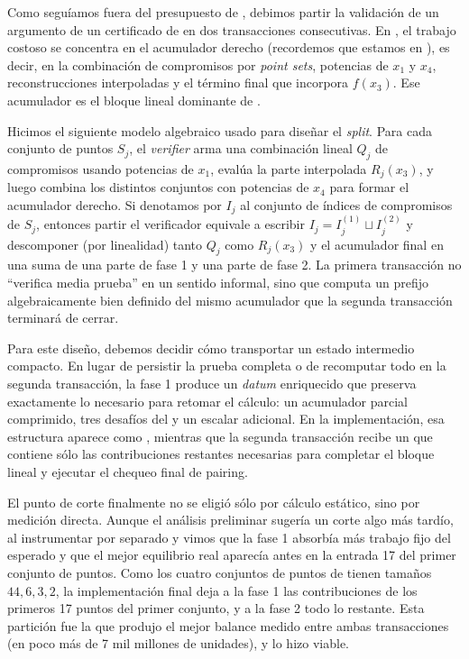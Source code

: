 Como seguíamos fuera del presupuesto de \maxTxExUnits, debimos partir la validación de un argumento \STM de un certificado de \Mithril en dos transacciones consecutivas. En \MidnightSTMCircuit, el trabajo costoso se concentra en el acumulador derecho (recordemos que estamos en \HaloTwoMultiOpen), es decir, en la combinación de compromisos por \textit{point sets}, potencias de $x_1$ y $x_4$, reconstrucciones interpoladas y el término final que incorpora $f(x_3)$. Ese acumulador es el bloque lineal dominante de \ExUnits.

Hicimos el siguiente modelo algebraico usado para diseñar el \textit{split}. Para cada conjunto de puntos $S_j$, el \textit{verifier} arma una combinación lineal $Q_j$ de compromisos usando potencias de $x_1$, evalúa la parte interpolada $R_j(x_3)$, y luego combina los distintos conjuntos con potencias de $x_4$ para formar el acumulador derecho. Si denotamos por $I_j$ al conjunto de índices de compromisos de $S_j$, entonces partir el verificador equivale a escribir $I_j = I_j^{(1)} \sqcup I_j^{(2)}$ y descomponer (por linealidad) tanto $Q_j$ como $R_j(x_3)$ y el acumulador final en una suma de una parte de fase 1 y una parte de fase 2. La primera transacción no ``verifica media prueba'' en un sentido informal, sino que computa un prefijo algebraicamente bien definido del mismo acumulador que la segunda transacción terminará de cerrar.

Para este diseño, debemos decidir cómo transportar un estado intermedio compacto. En lugar de persistir la prueba completa o de recomputar todo en la segunda transacción, la fase 1 produce un \textit{datum} enriquecido que preserva exactamente lo necesario para retomar el cálculo: un acumulador parcial comprimido, tres desafíos del \transcript y un escalar adicional. En la implementación, esa estructura aparece como \PhaseOneState, mientras que la segunda transacción recibe un \ReducedRedeemer que contiene sólo las contribuciones restantes necesarias para completar el bloque lineal y ejecutar el chequeo final de pairing.

El punto de corte finalmente no se eligió sólo por cálculo estático, sino por medición directa. Aunque el análisis preliminar sugería un corte algo más tardío, al instrumentar por separado \PhaseOneSetupTx y \PhaseTwoVerifyTx vimos que la fase 1 absorbía más trabajo fijo del esperado y que el mejor equilibrio real aparecía antes en la entrada 17 del primer conjunto de puntos. Como los cuatro conjuntos de puntos de \MidnightSTMCircuit tienen tamaños $44, 6, 3, 2$, la implementación final deja a la fase 1 las contribuciones de los primeros 17 puntos del primer conjunto, y a la fase 2 todo lo restante. Esta partición fue la que produjo el mejor balance medido entre ambas transacciones (en poco más de 7 mil millones de unidades), y lo hizo viable.

